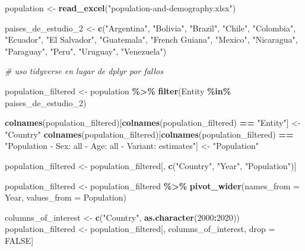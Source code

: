 \documentclass[
  11pt,
]{article}
\newenvironment{Shaded}{\begin{snugshade}}{\end{snugshade}}
\newcommand{\AttributeTok}[1]{\textcolor[rgb]{0.13,0.29,0.53}{#1}}
\newcommand{\CommentTok}[1]{\textcolor[rgb]{0.56,0.35,0.01}{\textit{#1}}}
\newcommand{\ConstantTok}[1]{\textcolor[rgb]{0.56,0.35,0.01}{#1}}
\newcommand{\DecValTok}[1]{\textcolor[rgb]{0.00,0.00,0.81}{#1}}
\newcommand{\FunctionTok}[1]{\textcolor[rgb]{0.13,0.29,0.53}{\textbf{#1}}}
\newcommand{\NormalTok}[1]{#1}
\newcommand{\OtherTok}[1]{\textcolor[rgb]{0.56,0.35,0.01}{#1}}
\newcommand{\SpecialCharTok}[1]{\textcolor[rgb]{0.81,0.36,0.00}{\textbf{#1}}}
\newcommand{\StringTok}[1]{\textcolor[rgb]{0.31,0.60,0.02}{#1}}
\begin{document}
\begin{Shaded}
\begin{Highlighting}[]
\NormalTok{population }\OtherTok{\textless{}{-}} \FunctionTok{read\_excel}\NormalTok{(}\StringTok{"population{-}and{-}demography.xlsx"}\NormalTok{)}

\NormalTok{paises\_de\_estudio\_2 }\OtherTok{\textless{}{-}} \FunctionTok{c}\NormalTok{(}\StringTok{"Argentina"}\NormalTok{, }\StringTok{"Bolivia"}\NormalTok{, }\StringTok{"Brazil"}\NormalTok{, }\StringTok{"Chile"}\NormalTok{, }\StringTok{"Colombia"}\NormalTok{,}
\StringTok{"Ecuador"}\NormalTok{, }\StringTok{"El Salvador"}\NormalTok{, }\StringTok{"Guatemala"}\NormalTok{, }\StringTok{"French Guiana"}\NormalTok{, }\StringTok{"Mexico"}\NormalTok{, }\StringTok{"Nicaragua"}\NormalTok{, }\StringTok{"Paraguay"}\NormalTok{, }\StringTok{"Peru"}\NormalTok{, }\StringTok{"Uruguay"}\NormalTok{, }\StringTok{"Venezuela"}\NormalTok{)}

\CommentTok{\# uso tidyverse en lugar de dplyr por fallos}

\NormalTok{population\_filtered }\OtherTok{\textless{}{-}}\NormalTok{ population }\SpecialCharTok{\%\textgreater{}\%}
  \FunctionTok{filter}\NormalTok{(Entity }\SpecialCharTok{\%in\%}\NormalTok{ paises\_de\_estudio\_2)}

\FunctionTok{colnames}\NormalTok{(population\_filtered)[}\FunctionTok{colnames}\NormalTok{(population\_filtered) }\SpecialCharTok{==} \StringTok{"Entity"}\NormalTok{] }\OtherTok{\textless{}{-}} \StringTok{"Country"}
\FunctionTok{colnames}\NormalTok{(population\_filtered)[}\FunctionTok{colnames}\NormalTok{(population\_filtered) }\SpecialCharTok{==} \StringTok{"Population {-} Sex: all {-} Age: all {-} Variant: estimates"}\NormalTok{] }\OtherTok{\textless{}{-}} \StringTok{"Population"}

\NormalTok{population\_filtered }\OtherTok{\textless{}{-}}\NormalTok{ population\_filtered[, }\FunctionTok{c}\NormalTok{(}\StringTok{"Country"}\NormalTok{, }\StringTok{"Year"}\NormalTok{, }\StringTok{"Population"}\NormalTok{)]}

\NormalTok{population\_filtered }\OtherTok{\textless{}{-}}\NormalTok{ population\_filtered }\SpecialCharTok{\%\textgreater{}\%}
  \FunctionTok{pivot\_wider}\NormalTok{(}\AttributeTok{names\_from =}\NormalTok{ Year, }\AttributeTok{values\_from =}\NormalTok{ Population)}

\NormalTok{columns\_of\_interest }\OtherTok{\textless{}{-}} \FunctionTok{c}\NormalTok{(}\StringTok{"Country"}\NormalTok{, }\FunctionTok{as.character}\NormalTok{(}\DecValTok{2000}\SpecialCharTok{:}\DecValTok{2020}\NormalTok{))}
\NormalTok{population\_filtered }\OtherTok{\textless{}{-}}\NormalTok{ population\_filtered[, columns\_of\_interest, drop }\OtherTok{=} \ConstantTok{FALSE}\NormalTok{]}


\end{Highlighting}
\end{Shaded}
\end{document}
